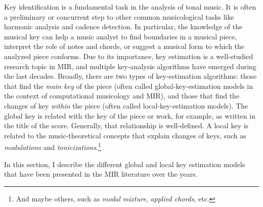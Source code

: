 

Key identification is a fundamental task in the analysis of
tonal music. It is often a preliminary or concurrent step to
other common musicological tasks like harmonic analysis and
cadence detection. In particular, the knowledge of the
musical key can help a music analyst to find boundaries in a
musical piece, interpret the role of notes and chords, or
suggest a musical form to which the analyzed piece conforms.
Due to its importance, key estimation is a well-studied
research topic in MIR, and multiple key-analysis algorithms
have emerged during the last decades. Broadly, there are two
types of key-estimation algorithms: those that find the
\emph{main key} of the piece (often called
global-key-estimation models in the context of computational
musicology and MIR), and those that find the changes of key
\emph{within} the piece (often called local-key-estimation
models). The global key is related with the key of the piece
or work, for example, as written in the title of the score.
Generally, that relationship is well-defined. A local key is
related to the music-theoretical concepts that explain
changes of keys, such as \emph{modulations} and
\emph{tonicizations}.\footnote{And maybe others, such as
\emph{modal mixture}, \emph{applied chords}, etc.}

In this section, I describe the different global and local
key estimation models that have been presented in the MIR
literature over the years.
